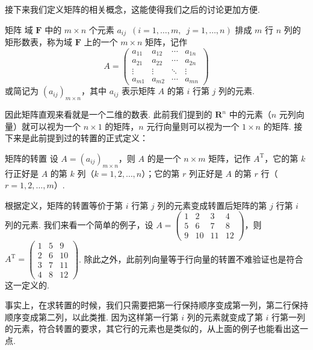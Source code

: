 接下来我们定义矩阵的相关概念，这能使得我们之后的讨论更加方便.

\begin{definition}{矩阵}{}
    域 $\mathbf{F}$ 中的 $m \times n$ 个元素 $a_{ij} \enspace (i = 1,\ldots,m, \enspace j=1,\ldots,n)$ 排成 $m$ 行 $n$ 列的矩形数表，称为域 $\mathbf{F}$ 上的一个 $m\times n$ 矩阵，记作
    \[A = \begin{pmatrix}
            a_{11} & a_{12} & \cdots & a_{1n} \\
            a_{21} & a_{22} & \cdots & a_{2n} \\
            \vdots & \vdots & \ddots & \vdots \\
            a_{m1} & a_{m2} & \cdots & a_{mn}
        \end{pmatrix}\]
    或简记为 $(a_{ij})_{m \times n}$，其中 $a_{ij}$ 表示矩阵 $A$ 的第 $i$ 行第 $j$ 列的元素.
\end{definition}

因此矩阵直观来看就是一个二维的数表. 此前我们提到的 $\mathbf{R}^n$ 中的元素（$n$ 元列向量）就可以视为一个 $n \times 1$ 的矩阵，$n$ 元行向量则可以视为一个 $1 \times n$ 的矩阵. 接下来是此前提到过的转置的正式定义：

\begin{definition}{矩阵的转置}{}
    设 $A = (a_{ij})_{m \times n}$，则 $A$ 的是一个 $n \times m$ 矩阵，记作 $A^\mathrm{T}$，它的第 $k$ 行正好是 $A$ 的第 $k$ 列（$k = 1,2,\ldots,n$）；它的第 $r$ 列正好是 $A$ 的第 $r$ 行（$r = 1,2,\ldots,m$）.
\end{definition}

根据定义，矩阵的转置等价于第 $i$ 行第 $j$ 列的元素变成转置后矩阵的第 $j$ 行第 $i$ 列的元素. 我们来看一个简单的例子，设 $A = \begin{pmatrix}1 & 2 & 3 & 4 \\ 5 & 6 & 7 & 8 \\ 9 & 10 & 11 & 12\end{pmatrix}$，则 $A^\mathrm{T} = \begin{pmatrix}1 & 5 & 9 \\ 2 & 6 & 10 \\ 3 & 7 & 11 \\ 4 & 8 & 12\end{pmatrix}$. 除此之外，此前列向量等于行向量的转置不难验证也是符合这一定义的.

事实上，在求转置的时候，我们只需要把第一行保持顺序变成第一列，第二行保持顺序变成第二列，以此类推. 因为这样第一行第 $i$ 列的元素就变成了第 $i$ 行第一列的元素，符合转置的要求，其它行的元素也是类似的，从上面的例子也能看出这一点.

